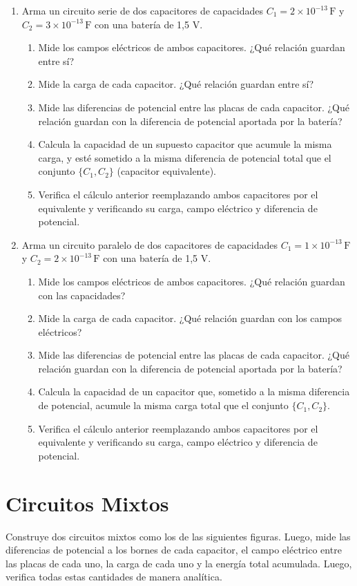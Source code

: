 \documentclass[12pt]{report}
\begin{document}
\begin{enumerate}
    \item Arma un circuito serie de dos capacitores de capacidades $C_1 = 2 \times 10^{-13} \, \text{F}$ y $C_2 = 3 \times 10^{-13} \, \text{F}$ con una batería de 1,5 V.
    \begin{enumerate}
        \item Mide los campos eléctricos de ambos capacitores. ¿Qué relación guardan entre sí?
        \item Mide la carga de cada capacitor. ¿Qué relación guardan entre sí?
        \item Mide las diferencias de potencial entre las placas de cada capacitor. ¿Qué relación guardan con la diferencia de potencial aportada por la batería?
        \item Calcula la capacidad de un supuesto capacitor que acumule la misma carga, y esté sometido a la misma diferencia de potencial total que el conjunto $\{C_1, C_2\}$ (capacitor equivalente).
        \item Verifica el cálculo anterior reemplazando ambos capacitores por el equivalente y verificando su carga, campo eléctrico y diferencia de potencial.
    \end{enumerate}
    
    \item Arma un circuito paralelo de dos capacitores de capacidades $C_1 = 1 \times 10^{-13} \, \text{F}$ y $C_2 = 2 \times 10^{-13} \, \text{F}$ con una batería de 1,5 V.
    \begin{enumerate}
        \item Mide los campos eléctricos de ambos capacitores. ¿Qué relación guardan con las capacidades?
        \item Mide la carga de cada capacitor. ¿Qué relación guardan con los campos eléctricos?
        \item Mide las diferencias de potencial entre las placas de cada capacitor. ¿Qué relación guardan con la diferencia de potencial aportada por la batería?
        \item Calcula la capacidad de un capacitor que, sometido a la misma diferencia de potencial, acumule la misma carga total que el conjunto $\{C_1, C_2\}$.
        \item Verifica el cálculo anterior reemplazando ambos capacitores por el equivalente y verificando su carga, campo eléctrico y diferencia de potencial.
    \end{enumerate}
\end{enumerate}

\section{Circuitos Mixtos}

Construye dos circuitos mixtos como los de las siguientes figuras. Luego, mide las diferencias de potencial a los bornes de cada capacitor, el campo eléctrico entre las placas de cada uno, la carga de cada uno y la energía total acumulada. Luego, verifica todas estas cantidades de manera analítica.
\end{document}
